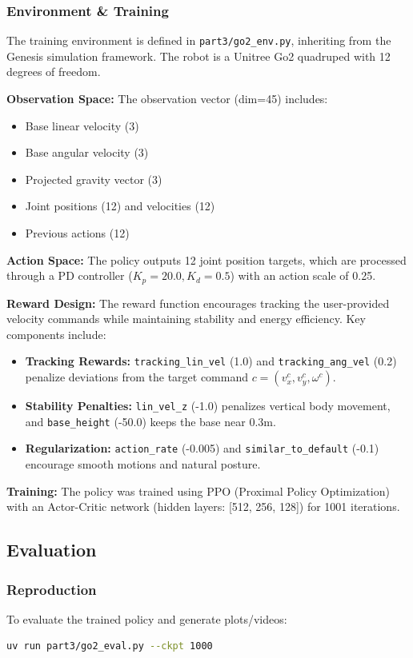\documentclass[UTF8]{ctexart}
\begin{document}
\subsubsection{Environment \& Training}
The training environment is defined in \texttt{part3/go2\_env.py}, inheriting from the Genesis simulation framework. The robot is a Unitree Go2 quadruped with 12 degrees of freedom.

\textbf{Observation Space:} The observation vector (dim=45) includes:
\begin{itemize}
    \item Base linear velocity (3)
    \item Base angular velocity (3)
    \item Projected gravity vector (3)
    \item Joint positions (12) and velocities (12)
    \item Previous actions (12)
\end{itemize}

\textbf{Action Space:} The policy outputs 12 joint position targets, which are processed through a PD controller ($K_p=20.0, K_d=0.5$) with an action scale of 0.25.

\textbf{Reward Design:} The reward function encourages tracking the user-provided velocity commands while maintaining stability and energy efficiency. Key components include:
\begin{itemize}
    \item \textbf{Tracking Rewards:} \texttt{tracking\_lin\_vel} (1.0) and \texttt{tracking\_ang\_vel} (0.2) penalize deviations from the target command $c=(v_x^c, v_y^c, \omega^c)$.
    \item \textbf{Stability Penalties:} \texttt{lin\_vel\_z} (-1.0) penalizes vertical body movement, and \texttt{base\_height} (-50.0) keeps the base near 0.3m.
    \item \textbf{Regularization:} \texttt{action\_rate} (-0.005) and \texttt{similar\_to\_default} (-0.1) encourage smooth motions and natural posture.
\end{itemize}

\textbf{Training:} The policy was trained using PPO (Proximal Policy Optimization) with an Actor-Critic network (hidden layers: [512, 256, 128]) for 1001 iterations.

\subsection{Evaluation}
\subsubsection{Reproduction}
To evaluate the trained policy and generate plots/videos:
\begin{lstlisting}[language=bash,xleftmargin=2em]
uv run part3/go2_eval.py --ckpt 1000
\end{lstlisting}
\end{document}
